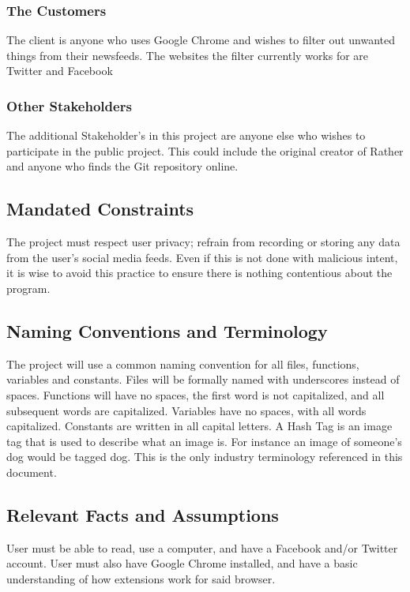 \documentclass[12pt, titlepage]{article}
\begin{document}
\subsubsection{The Customers}
The client is anyone who uses Google Chrome and wishes to filter out unwanted things from their newsfeeds. The websites the filter currently works for are Twitter and Facebook

\subsubsection{Other Stakeholders}
The additional Stakeholder's in this project are anyone else who wishes to participate in the public project. This could include the original creator of Rather and anyone who finds the Git repository online. 

\subsection{Mandated Constraints}
The project must respect user privacy; refrain from recording or storing any data from the user's social media feeds. Even if this is not done with malicious intent, it is wise to avoid this practice to ensure there is nothing contentious about the program.

\subsection{Naming Conventions and Terminology}
The project will use a common naming convention for all files, functions, variables and constants. Files will be formally named with underscores instead of spaces. Functions will have no spaces, the first word is not capitalized, and all subsequent words are capitalized. Variables have no spaces, with all words capitalized. Constants are written in all capital letters. A Hash Tag is an image tag that is used to describe what an image is. For instance an image of someone's dog would be tagged dog. This is the only industry terminology referenced in this document.  

\subsection{Relevant Facts and Assumptions}
User must be able to read, use a computer, and have a Facebook and/or Twitter account. User must also have Google Chrome installed, and have a basic understanding of how extensions work for said browser.
\end{document}
